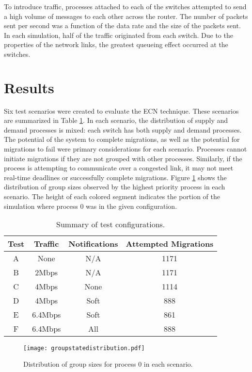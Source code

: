 To introduce traffic, processes attached to each of the switches attempted to send a high volume of messages to each other across the router.
The number of packets sent per second was a function of the data rate and the size of the packets sent.
In each simulation, half of the traffic originated from each switch.
Due to the properties of the network links, the greatest queueing effect occurred at the switches.

\section{Results}
\label{sect:results}
Six test scenarios were created to evaluate the \ac{ECN} technique.
These scenarios are summarized in Table \ref{tab:scenarios}.
In each scenario, the distribution of supply and demand processes is mixed: each switch has both supply and demand processes.
The potential of the system to complete migrations, as well as the potential for migrations to fail were primary considerations for each scenario.
Processes cannot initiate migrations if they are not grouped with other processes.
Similarly, if the process is attempting to communicate over a congested link, it may not meet real-time deadlines or successfully complete migrations.
Figure \ref{fig:groupstatedistro} shows the distribution of group sizes observed by the highest priority process in each scenario.
The height of each colored segment indicates the portion of the simulation where process 0 was in the given configuration.

\begin{table}[htpb]
\centering
\caption{Summary of test configurations.}
\begin{tabular}{| c | c | c | c |}
    \hline
    Test & Traffic & Notifications & Attempted Migrations \\ \hline
    A & None & N/A & 1171 \\ \hline
    B & 2Mbps & N/A & 1171 \\ \hline
    C & 4Mbps & None & 1114  \\ \hline
    D & 4Mbps & Soft & 888 \\ \hline
    E & 6.4Mbps & Soft & 861 \\ \hline
    F & 6.4Mbps & All & 888 \\ \hline
\end{tabular}
\label{tab:scenarios}
\end{table}

\begin{figure}[htbp]
\centering
\texttt{[image: groupstatedistribution.pdf]}
\caption{Distribution of group sizes for process 0 in each scenario.}
\label{fig:groupstatedistro}
\end{figure}


